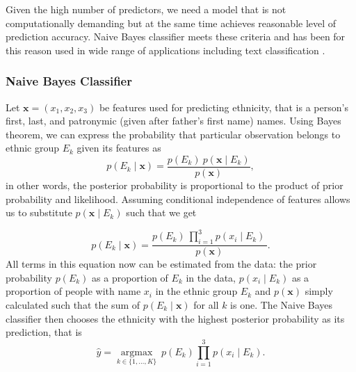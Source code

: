 Given the high number of predictors, we need a model that is not  computationally demanding but at the same time achieves reasonable level of prediction accuracy. Naive Bayes classifier meets these criteria and has been for this reason used in wide range of applications including text classification  \citep{gentzkow_text_2019}.

\subsubsection{Naive Bayes Classifier}
Let  $\boldsymbol{x} = \left(x_1, x_2, x_3\right)$ be features used for predicting ethnicity, that is a person's first, last, and patronymic (given after father's first name) names. Using Bayes theorem, we can express the probability that particular observation  belongs to ethnic group $E_k$ given its features as
\begin{equation}
p(E_k \mid \mathbf{x}) = \frac{p(E_k) \ p(\mathbf{x} \mid E_k)}{p(\mathbf{x})},
\end{equation}
in other words, the posterior probability is proportional to the product of prior probability and likelihood. 
Assuming conditional independence of features allows us to substitute $p(\mathbf{x} \mid E_k)$ such that we get

\begin{equation}
p(E_k \mid \mathbf{x}) = \frac{p(E_k) \  \prod_{i=1}^3 p(x_i \mid E_k)\,}{p(\mathbf{x})}.
\end{equation}
 All terms in this equation now can be estimated from the data: the prior probability $p(E_k)$ as a proportion of $E_k$ in the data, $p(x_i \mid E_k)$ as a proportion of people with name $x_i$ in the ethnic group $E_k$ and $p(\mathbf{x})$ simply calculated such that the sum of $p(E_k \mid \mathbf{x})$ for all $k$ is one. 
The Naive Bayes classifier then chooses the ethnicity with the highest posterior probability as its prediction, that is
\begin{equation}
    \hat{y} = \underset{k \in \{1, \dots, K\}}{\operatorname{argmax}} \ p(E_k) \displaystyle\prod_{i=1}^{3} p(x_i \mid E_k).
\end{equation}

